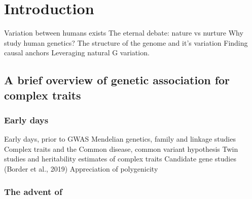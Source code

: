 %
%

\chapter{Introduction}

\begin{outline}
    \1 Variation between humans exists
    \1 The eternal debate: nature vs nurture
    \1 Why study human genetics?
    \1 The structure of the genome and it's variation
    \1 Finding causal anchors
    \1 Leveraging natural G variation.
\end{outline}

\section{A brief overview of genetic association for complex traits}

\subsection{Early days}

\begin{outline}
    \1 Early days, prior to GWAS
    \1 Mendelian genetics, family and linkage studies
    \1 Complex traits and the Common disease, common variant hypothesis
    \1 Twin studies and heritability estimates of complex traits
    \1 Candidate gene studies (Border et al., 2019)
    \1 Appreciation of polygenicity
\end{outline}

\subsection{The advent of }


